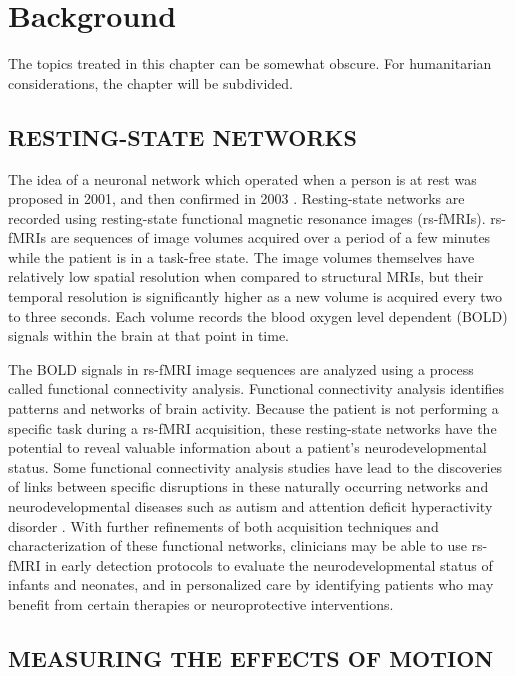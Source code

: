 \chapter{Background}
The topics treated in this chapter can be somewhat obscure. For humanitarian considerations, the chapter will be subdivided.

\section{RESTING-STATE NETWORKS}

The idea of a neuronal network which operated when a person is at rest was proposed in 2001, and then confirmed in 2003 \cite{Raichle2001} \cite{Greicius2003}. Resting-state networks are recorded using resting-state functional magnetic resonance images (rs-fMRIs). rs-fMRIs are sequences of image volumes acquired over a period of a few minutes while the patient is in a task-free state. The image volumes themselves have relatively low spatial resolution when compared to structural MRIs, but their temporal resolution is significantly higher as a new volume is acquired every two to three seconds. Each volume records the blood oxygen level dependent (BOLD) signals within the brain at that point in time. 

The BOLD signals in rs-fMRI image sequences are analyzed using a process called functional connectivity analysis. Functional connectivity analysis identifies patterns and networks of brain activity. Because the patient is not performing a specific task during a rs-fMRI acquisition, these resting-state networks have the potential to reveal valuable information about a patient's neurodevelopmental status. Some functional connectivity analysis studies have lead to the discoveries of links between specific disruptions in these naturally occurring networks and neurodevelopmental diseases such as autism and attention deficit hyperactivity disorder \cite{Assaf2010} \cite{Zang2007}. With further refinements of both acquisition techniques and characterization of these functional networks, clinicians may be able to use rs-fMRI in early detection protocols to evaluate the neurodevelopmental status of infants and neonates, and in personalized care by identifying patients who may benefit from certain therapies or neuroprotective interventions.

\section{MEASURING THE EFFECTS OF MOTION}

